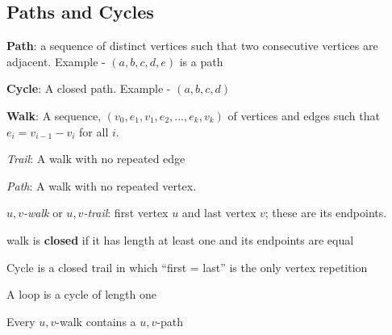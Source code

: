 \documentclass{article}
\theoremstyle{definition}
\theoremstyle{definition}
\newenvironment{manualprop}[1]{%
  \renewcommand\themanualpropinner{#1}%
  \manualpropinner
}{\endmanualpropinner}
\theoremstyle{named}
\begin{document}
\subsection{Paths and Cycles}
\begin{citemize}
    \item \textbf{Path}: a sequence of distinct vertices such that
two consecutive vertices are adjacent. Example - $(a, b, c, d, e)$ is a path

    \item \textbf{Cycle}: A closed path. Example - $(a, b, c, d)$

    \item \textbf{Walk}: A sequence, $(v_0,e_1,v_1,e_2, ...,  e_k,v_k)$
of vertices and edges such that $e_i = v_{i-1} - v_i$ for all $i$.
    \begin{citemize}
        \item \textit{Trail}: A walk with no repeated edge
        \item \textit{Path}: A walk with no repeated vertex.
        \item \textit{$u,v$-walk} or \textit{$u,v$-trail}:  first vertex $u$ and last vertex
$v$; these are its endpoints.
        \item walk is \textbf{closed} if it has length at least one and its endpoints are equal
        \begin{citemize}
            \item Cycle is a closed trail in which “first = last” is the only vertex repetition
            \item A loop is a cycle of length one
        \end{citemize}
    \end{citemize}
\end{citemize}

\begin{manualprop}{31}
    Every $u,v$-walk contains a $u,v$-path
\end{manualprop}
\end{document}
